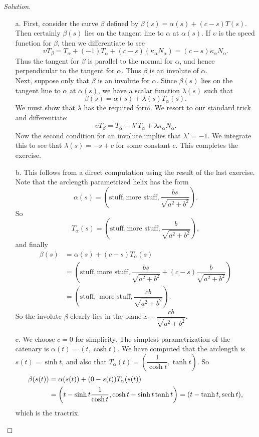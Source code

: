 \documentclass[Shifrin_Solutions_Spring_2018]{subfiles}
\begin{document}
\begin{proof}[Solution]
\begin{itemize}
\item[a.] First, consider the curve $\beta$ defined by $\beta(s) = \alpha(s) + (c-s)T(s)$. Then certainly $\beta(s)$ lies on the tangent line to $\alpha$ at $\alpha(s)$. If $\upsilon$ is the speed function for $\beta$, then we differentiate to see
\[
\upsilon T_{\beta} = T_{\alpha} + (-1)T_{\alpha}  + (c-s)(\kappa_{\alpha} N_{\alpha}) = (c-s) \kappa_{\alpha} N_{\alpha} .
\]
Thus the tangent for $\beta$ is parallel to the normal for $\alpha$, and hence perpendicular to the tangent for $\alpha$. Thus $\beta$ is an involute of $\alpha$. \\

Next, suppose only that $\beta$ is an involute for $\alpha$. Since $\beta(s)$ lies on the tangent line to $\alpha$ at $\alpha(s)$, we have a scalar function $\lambda(s)$ such that
\[
\beta(s) = \alpha(s) + \lambda(s) T_{\alpha}(s) .
\]
We must show that $\lambda$ has the required form. We resort to our standard trick and differentiate:
\[
\upsilon T_{\beta} = T_{\alpha} + \lambda' T_{\alpha} + \lambda\kappa_{\alpha} N_{\alpha}.
\]
Now the second condition for an involute implies that $\lambda' = -1$. We integrate this to see that $\lambda(s) = -s + c$ for some constant $c$. This completes the exercise.\\


\item[b.] This follows from a direct computation using the result of the last exercise. Note that the arclength parametrized helix has the form
\[
\alpha(s) = \left( \mbox{stuff}, \mbox{more stuff} , \dfrac{bs}{\sqrt{a^2+b^2}} \right) .
\]
So
\[
T_{\alpha}(s) = \left( \mbox{stuff}, \mbox{more stuff}, \dfrac{b}{\sqrt{a^2 + b^2}}  \right),
\]
and finally
\[
\begin{split}
\beta(s) & = \alpha(s) + (c - s) T_{\alpha}(s)\\
&  = \left( \mbox{stuff}, \mbox{more stuff}, \dfrac{bs}{\sqrt{a^2+b^2}} + (c-s)\dfrac{b}{\sqrt{a^2 + b^2}} \right) \\
	& = \left( \mbox{stuff}, \mbox{ more stuff} , \dfrac{cb}{\sqrt{a^2+b^2}} \right) .
\end{split}
\]
So the involute $\beta$ clearly lies in the plane $z = \dfrac{cb}{\sqrt{a^2+b^2}}$.\\

\item[c.]  We choose $c=0$ for simplicity. The simplest parametrization of the catenary is $\alpha(t) = ( t ,\cosh t)$. We have computed that the arclength is $s(t)  = \sinh t$, and also that
$T_{\alpha}(t) =\left( \dfrac{1}{\cosh t} , \tanh t\right)  $.
 So
\[
\begin{split}
\beta(s(t)) & = \alpha(s(t)) + (0 -s(t) ) T_{\alpha}(s(t))\\
&  = \left(t - \sinh t\dfrac{1}{\cosh t} , \cosh t - \sinh t \tanh t \right) = ( t - \tanh t , \operatorname{\mathrm{sech}} t) ,
\end{split}
\]
which is the tractrix.\\


\end{itemize}
\end{proof}
\end{document}
